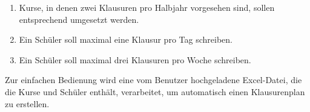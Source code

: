 \begin{enumerate} 

\item Kurse, in denen zwei Klausuren pro Halbjahr vorgesehen sind, sollen entsprechend umgesetzt werden.

\item Ein Schüler soll maximal eine Klausur pro Tag schreiben.

\item Ein Schüler soll maximal drei Klausuren pro Woche schreiben.

\end{enumerate}
Zur einfachen Bedienung wird eine vom Benutzer hochgeladene Excel-Datei, die die Kurse und Schüler enthält, verarbeitet, um automatisch einen Klausurenplan zu erstellen.
